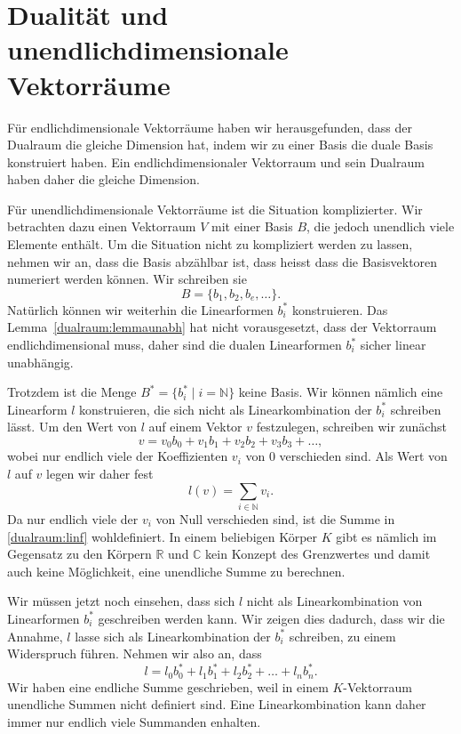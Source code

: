 %
%
%
\section{Dualität und unendlichdimensionale Vektorräume%
\label{section:dualraum:unendlich}}
Für endlichdimensionale Vektorräume haben wir herausgefunden, dass
der Dualraum die gleiche Dimension hat, indem wir zu einer Basis die
duale Basis konstruiert haben.
Ein endlichdimensionaler Vektorraum und sein Dualraum haben daher die
gleiche Dimension.

Für unendlichdimensionale Vektorräume ist die Situation komplizierter.
Wir betrachten dazu einen Vektorraum $V$ mit einer Basis $B$, die jedoch
unendlich viele Elemente enthält.
Um die Situation nicht zu kompliziert werden zu lassen, nehmen wir an,
dass die Basis abzählbar ist, dass heisst dass die Basisvektoren 
numeriert werden können.
Wir schreiben sie
\[
B= \{ b_1,b_2,b_e,\dots\}.
\]
Natürlich können wir weiterhin die Linearformen $b_i^*$ konstruieren.
Das Lemma~\ref{dualraum:lemmaunabh} hat nicht vorausgesetzt, dass der
Vektorraum endlichdimensional muss, daher sind die dualen Linearformen
$b_i^*$ sicher linear unabhängig.

Trotzdem ist die Menge $B^*=\{b_i^*\;|\; i=\mathbb N\}$ keine Basis.
Wir können nämlich eine Linearform $l$ konstruieren, die sich nicht als 
Linearkombination der $b_i^*$ schreiben lässt.
Um den Wert von $l$ auf einem Vektor $v$ festzulegen, schreiben wir
zunächst
\[
v=v_0b_0+v_1b_1+v_2b_2+v_3b_3+\dots,
\]
wobei nur endlich viele der Koeffizienten $v_i$ von $0$ verschieden sind.
Als Wert von $l$ auf $v$ legen wir daher fest
\begin{equation}
l(v) = \sum_{i\in\mathbb N} v_i.
\label{dualraum:linf}
\end{equation}
Da nur endlich viele der $v_i$ von Null verschieden sind, ist die Summe
in \eqref{dualraum:linf} wohldefiniert.
In einem beliebigen Körper $K$ gibt es nämlich im Gegensatz zu den
Körpern $\mathbb R$ und $\mathbb C$ kein Konzept des Grenzwertes und
damit auch keine Möglichkeit, eine unendliche Summe zu berechnen.

Wir müssen jetzt noch einsehen, dass sich $l$ nicht als Linearkombination
von Linearformen $b_i^*$ geschreiben werden kann.
Wir zeigen dies dadurch, dass wir die Annahme, $l$ lasse sich als
Linearkombination der $b_i^*$ schreiben, zu einem Widerspruch führen.
Nehmen wir also an, dass 
\begin{equation}
l=l_0b_0^* + l_1b_1^*+l_2b_2^*+\dots+l_nb_n^*.
\label{dualraum:linf2}
\end{equation}
Wir haben eine endliche Summe geschrieben, weil in einem $K$-Vektorraum
unendliche Summen nicht definiert sind.
Eine Linearkombination kann daher immer nur endlich viele Summanden
enhalten.


